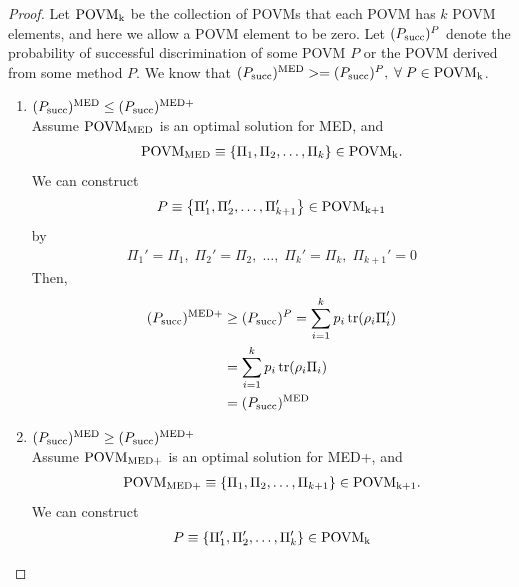 \begin{proof}
    \noindent

    Let $\textnormal{POVM}_{\textnormal{k}}$ be the collection of POVMs that each POVM has $k$ POVM
    elements, and here we allow a POVM element to be zero.
    Let $(P_{\mathrm{succ}})^{P}$ denote the probability of successful discrimination of
    some POVM $P$ or the POVM derived from some method $P$.
    We know that $(P_{\mathrm{succ}})^{\textnormal{MED}} >= (P_{\mathrm{succ}})^{P}, \; \forall \; P \in \textnormal{POVM}_{\textnormal{k}}$.
    \begin{enumerate}
        \item $(P_{\mathrm{succ}})^{\textnormal{MED}} \leq (P_{\mathrm{succ}})^{\textnormal{MED+}}$\\
              Assume $\textnormal{POVM}_{\textnormal{MED}}$ is an optimal solution for MED, and
              \begin{align*}
                  \textnormal{POVM}_{\textnormal{MED}} \equiv \left\{ \Pi_1, \Pi_2, \dots, \Pi_{k} \right\} \in \textnormal{POVM}_{\textnormal{k}}.
              \end{align*}
              We can construct
              \begin{align*}
                  P \equiv \left\{ \Pi_1', \Pi_2', \dots, \Pi_{k+1}' \right\} \in \textnormal{POVM}_{\textnormal{k+1}}
              \end{align*}
              by
              \begin{align*}
                  \Pi_{1}' = \Pi_{1}, \; \Pi_{2}' = \Pi_{2}, \; \dots,
                  \; \Pi_{k}' = \Pi_{k}, \; \Pi_{k+1}' = 0
              \end{align*}
              Then,
              \begin{align}
                  (P_{\mathrm{succ}})^{\textnormal{MED+}} & \geq (P_{\mathrm{succ}})^{P}
                  = \sum_{i=1}^{k} p_{i} \operatorname{tr}(\rho_{i} \Pi_{i}')                      \\
                                      & = \sum_{i=1}^{k} p_{i} \operatorname{tr}(\rho_{i} \Pi_{i}) \\
                                      & = (P_{\mathrm{succ}})^{\textnormal{MED}}
              \end{align}
        \item $(P_{\mathrm{succ}})^{\textnormal{MED}} \geq (P_{\mathrm{succ}})^{\textnormal{MED+}}$\\
              Assume $\textnormal{POVM}_{\textnormal{MED+}}$ is an optimal solution for MED+, and
              \begin{align*}
                  \textnormal{POVM}_{\textnormal{MED+}} \equiv \left\{ \Pi_1, \Pi_2, \dots, \Pi_{k+1} \right\} \in \textnormal{POVM}_{\textnormal{k+1}}.
              \end{align*}
              We can construct
              \begin{align*}
                  P \equiv \left\{ \Pi_1', \Pi_2', \dots, \Pi_{k}' \right\} \in \textnormal{POVM}_{\textnormal{k}}
              \end{align*}

\end{enumerate}
\end{proof}
